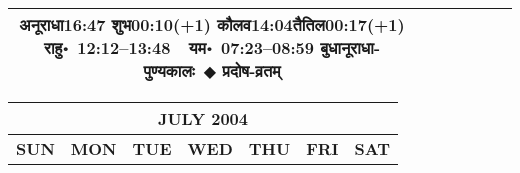\documentclass[a3paper,12pt,landscape]{article}
\newcommand{\eventsep}{~$\Diamondblack$ }
\newcommand{\To}{\hspace{1pt}\raisebox{0pt}{\tiny\RIGHTarrow}\hspace{1pt}}
\newcommand{\rahuyama}[2]{%
{राहु॰~\textsf{#1}~~यम॰~\textsf{#2}}
}
\begin{document}
\begin{center}
\begin{tabular}{|c|c|c|c|c|c|c|}
{{\mbox{अनूराधा\To{}\textsf{16:47\hspace{2ex}}}}%
{\mbox{शुभ\To{}\textsf{00:10(+1)\hspace{2ex}}}}%
{\mbox{कौलव\To{}\textsf{14:04\hspace{2ex}}}\mbox{तैतिल\To{}\textsf{00:17(+1)\hspace{2ex}}}}}%
{\rahuyama{12:12--13:48}{07:23--08:59}}%
{बुधानूराधा-पुण्यकालः\eventsep प्रदोष-व्रतम्}
&
\mbox{}  & %
\mbox{}  & %
\\ \hline
\end{tabular}



\begin{tabular}{|c|c|c|c|c|c|c|}
\multicolumn{7}{c}{\Large \bfseries \sffamily JULY 2004}\\[3mm]
\hline
\textbf{\textsf{SUN}} & \textbf{\textsf{MON}} & \textbf{\textsf{TUE}} & \textbf{\textsf{WED}} & \textbf{\textsf{THU}} & \textbf{\textsf{FRI}} & \textbf{\textsf{SAT}} \\ \hline


\end{tabular}
\end{center}
\end{document}
